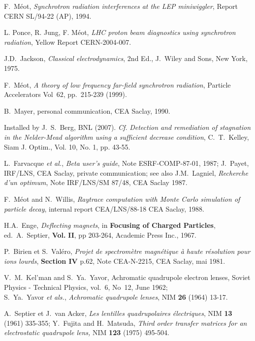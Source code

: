 \begin{thebibliography}{99}
 F.~M\'eot, \textsl{Synchrotron radiation interferences at the LEP miniwiggler}, 
Report CERN SL/94-22 (AP), 1994. 

 L. Ponce,  R. Jung, F. M\'eot, 
\textsl{LHC proton beam diagnostics using synchrotron radiation},  
Yellow Report CERN-2004-007. 

 J.D.~Jackson, \textsl{Classical electrodynamics}, 2nd 
Ed., J.~Wiley and Sons, New York, 1975.

 F.~M\'eot, 
\textsl{A theory of low frequency far-field synchrotron radiation}, 
 Particle Accelerators Vol~62, pp.~215-239  (1999). 

 B.~Mayer, personal communication,
CEA Saclay, 1990. 

 Installed by J.~S.~Berg, BNL (2007). \emph{Cf.} \textsl{Detection and remediation of stagnation in the 
Nelder-Mead algorithm using a sufficient decrease condition}, 
  C.~T.~Kelley, Siam J. Optim., Vol. 10, No. 1, pp. 43-55. 

 L.~Farvacque \textsl{et al.}, \textsl{Beta user's guide}, Note 
ESRF-COMP-87-01, 1987; 
J.~Payet, IRF/LNS, CEA Saclay, private communication; see also J.M.~Lagniel, 
\textsl{Recherche d'un optimum}, Note IRF/LNS/SM 87/48, CEA Saclay 1987.

 F.~M\'eot and N.~Willis, \textsl{Raytrace computation with 
Monte Carlo simulation of particle decay}, internal report CEA/LNS/88-18 
CEA Saclay, 1988. 

 H.A.~Enge, \textsl{Deflecting magnets}, in \textbf{Focusing of 
Charged Particles}, ed.~A.~Septier, \textbf{Vol.}  \textbf{II}, pp 203-264, Academic
Press Inc., 1967.

 P.~Birien et S.~Val\'ero, \textsl{Projet de spectrom\`etre 
magn\'etique \`a haute r\'esolution pour ions lourds}, \textbf{Section IV} 
p.62, Note CEA-N-2215, CEA Saclay, mai 1981.

 V.~M.~Kel'man and S.~Ya.~Yavor, Achromatic
quadrupole electron lenses, Soviet Physics - Technical Physics, vol.~6, No~12, June 1962; \\
S.~Ya.~Yavor \textsl{et als.}, \textsl{Achromatic quadrupole lenses}, NIM \textbf{26} (1964) 13-17. 

 A.~Septier et J.~van Acker, \textsl{Les lentilles quadrupolaires 
\'electriques}, NIM \textbf{13} (1961) 335-355; Y.~Fujita and H.~Matsuda, 
\textsl{Third order transfer matrices for an electrostatic quadrupole lens,} 
NIM \textbf{123} (1975) 495-504. 


\end{thebibliography}
